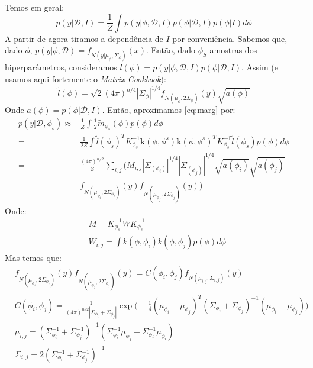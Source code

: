 \documentclass[12pt]{article}
\begin{document}
 Temos em geral:
 \begin{equation}\label{eq:marg}
	p(y|\mathcal{D},I) = \frac{1}{Z} \int p(y | \phi, \mathcal{D},I) p(\phi| \mathcal{D},I) 
		p(\phi | I) d \phi
 \end{equation}
 A partir de agora tiramos a dependência de $I$ por conveniência. Sabemos que, dado $\phi$, 
 $p(y | \phi, \mathcal{D}) = f_{N(y | \mu_\phi, \Sigma_\phi)}(x)$. Então, dado $\phi_S$ 
 amostras dos hiperparâmetros, consideramos $l(\phi) = p(y | \phi, \mathcal{D},I) p(\phi| \mathcal{D},I)$. 
 Assim (e usamos aqui fortemente o \textit{Matrix Cookbook}):
 \begin{equation}
	\tilde{l}(\phi) = \sqrt{2} (4 \pi)^{n/4} |\Sigma_{\phi}|^{1/4} f_{N(\mu_\phi, 2 \Sigma_\phi)}(y) 
		\sqrt{a(\phi)}
 \end{equation}
 Onde $a(\phi) = p(\phi| \mathcal{D},I)$. Então, aproximamos \eqref{eq:marg} por:
 \begin{equation}\label{eq:approx1}
 \begin{split}
 p(y | \mathcal{D},\phi_s) \approx & \frac{1}{Z} \int \frac{1}{2} \tilde{m}_{\phi_s}(\phi) p(\phi) 
             d\phi \\
	 = & \frac{1}{2 Z} \int \tilde{l}(\phi_s)^T K_{\phi_s}^{-1} \mathbf{k}(\phi,\phi^s) 
						    \mathbf{k}(\phi,\phi^s)^T K_{\phi_s}^{-1} \tilde{l}(\phi_s) 
						    p(\phi) d\phi \\
	 = & \frac{(4 \pi)^{n/2}}{Z} \sum_{i,j} \Big( M_{i,j} |\Sigma_{(\phi_i)}|^{1/4} |\Sigma_{(\phi_j)}|^{1/4} 
			   \sqrt{a(\phi_i)} \sqrt{a(\phi_j)} \\
	 & f_{N(\mu_{\phi_i}, 2 \Sigma_{\phi_i})}(y) f_{N(\mu_{\phi_j}, 2 \Sigma_{\phi_j})}(y) \Big)
 \end{split}
 \end{equation}
 Onde:
 \begin{equation}
  \begin{split}
  & M = K_{\phi_s}^{-1} W K_{\phi_s}^{-1} \\
  & W_{i,j} = \int k(\phi,\phi_i) k(\phi,\phi_j) p(\phi) d \phi
  \end{split}
 \end{equation}
 Mas temos que:
 \begin{equation}
  \begin{split}
   & f_{N(\mu_{\phi_i}, 2 \Sigma_{\phi_i})}(y) f_{N(\mu_{\phi_j}, 2 \Sigma_{\phi_j})}(y) = 
    C(\phi_i,\phi_j) f_{N(\mu_{i,j}, \Sigma_{i,j})}(y) \\
    & C(\phi_i,\phi_j) = \frac{1}{(4 \pi)^{n/2} |\Sigma_{\phi_i} + \Sigma_{\phi_j}|} 
					         \exp \Big(-\frac{1}{4} (\mu_{\phi_i} - \mu_{\phi_j})^T (\Sigma_{\phi_i} + \Sigma_{\phi_j})^{-1} (\mu_{\phi_i} - \mu_{\phi_j})\Big) \\
	& \mu_{i,j} = (\Sigma_{\phi_i}^{-1} + \Sigma_{\phi_j}^{-1})^{-1} (\Sigma_{\phi_i}^{-1} \mu_{\phi_j} +
																		\Sigma_{\phi_j}^{-1} \mu_{\phi_i}) \\
	& \Sigma_{i,j} = 2 (\Sigma_{\phi_i}^{-1} + \Sigma_{\phi_j}^{-1})^{-1}
  \end{split}
 \end{equation}
\end{document}

